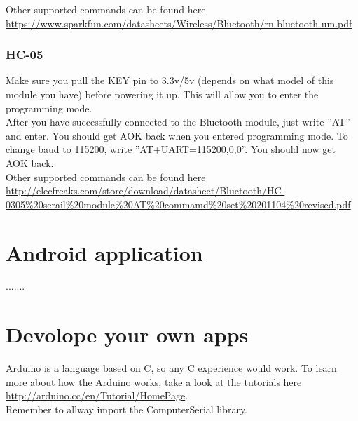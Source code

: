 				Other supported commands can be found here \url{https://www.sparkfun.com/datasheets/Wireless/Bluetooth/rn-bluetooth-um.pdf}

				\subsubsection{HC-05}
				Make sure you pull the KEY pin to 3.3v/5v (depends on what model of this module you have) before powering it up. This will allow you to enter the programming mode.\\
				
				After you have successfully connected to the Bluetooth module, just write ''AT'' and enter. You should get AOK back when you entered programming mode. To change baud to 115200, write ''AT+UART=115200,0,0''. You should now get AOK back.\\
				
				Other supported commands can be found here \url{http://elecfreaks.com/store/download/datasheet/Bluetooth/HC-0305%20serail%20module%20AT%20commamd%20set%20201104%20revised.pdf}
				
	\section{Android application}\label{sec:install-android-application}
	.......
	
	\section{Devolope your own apps}
	Arduino is a language based on C, so any C experience would work. To learn more about how the Arduino works, take a look at the tutorials here \url{http://arduino.cc/en/Tutorial/HomePage}.\\
	
	Remember to allway import the ComputerSerial library.